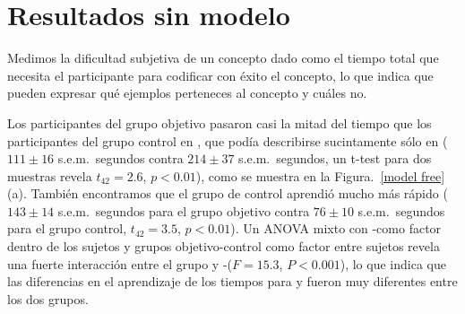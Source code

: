 \section{Resultados sin modelo}


Medimos la dificultad subjetiva de un concepto dado como el tiempo total que necesita el participante para codificar con éxito el concepto, lo que indica que pueden expresar qué ejemplos perteneces al concepto y cuáles no.



Los participantes del grupo objetivo pasaron casi la mitad del tiempo que los participantes del grupo control en \testa, que podía describirse sucintamente sólo en \gramboolxor ($111\pm16$ s.e.m.\ segundos contra $214\pm37$ s.e.m.\ segundos, un t-test para dos muestras revela $t_{42}=2.6$, $p<0.01$), como se muestra en la Figura.~\ref{model free} (a). También encontramos que el grupo de control aprendió mucho más rápido \testb ($143\pm14$ s.e.m.\ segundos para el grupo objetivo contra $76\pm10$ s.e.m.\ segundos para el grupo control, $t_{42}=3.5$, $p<0.01$). Un ANOVA mixto con \testa-\testb como factor dentro de los sujetos y grupos objetivo-control como factor entre sujetos revela una fuerte interacción entre el grupo y \testa-\testb ($F=15.3$, $P<0.001$), lo que indica que las diferencias en el aprendizaje de los tiempos para \testa y \testb fueron muy diferentes entre los dos grupos.

